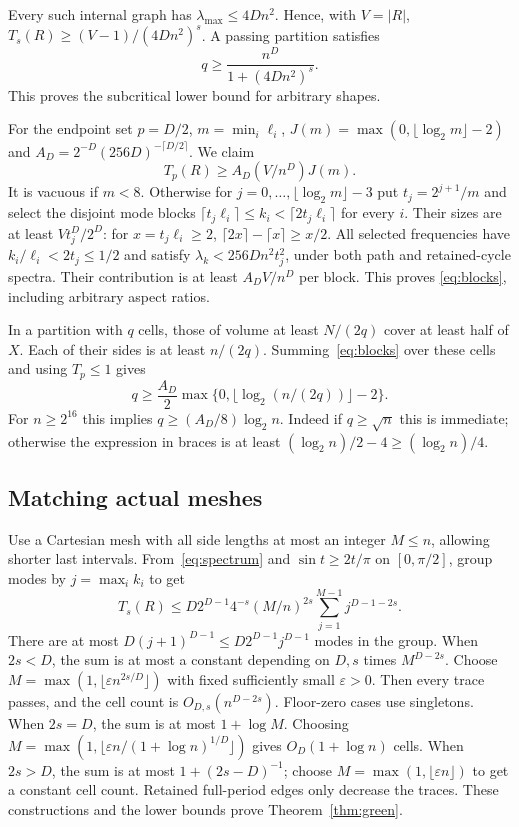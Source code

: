 \documentclass[11pt]{article}
\begin{document}
Every such internal graph has $\lambda_{\max}\le4Dn^2$. Hence, with
$V=|R|$, $T_s(R)\ge(V-1)/(4Dn^2)^s$. A passing partition satisfies
\begin{equation}\label{eq:subcrit}
 q\ge\frac{n^D}{1+(4Dn^2)^s}.
\end{equation}
This proves the subcritical lower bound for arbitrary shapes.

For the endpoint set $p=D/2$, $m=\min_i\ell_i$,
$J(m)=\max(0,\lfloor\log_2m\rfloor-2)$ and
$A_D=2^{-D}(256D)^{-\lceil D/2\rceil}$. We claim
\begin{equation}\label{eq:blocks}
 T_p(R)\ge A_D(V/n^D)J(m).
\end{equation}
It is vacuous if $m<8$. Otherwise for
$j=0,\ldots,\lfloor\log_2m\rfloor-3$ put $t_j=2^{j+1}/m$ and select
the disjoint mode blocks
$\lceil t_j\ell_i\rceil\le k_i<\lceil2t_j\ell_i\rceil$ for every $i$.
Their sizes are at least $Vt_j^D/2^D$: for $x=t_j\ell_i\ge2$,
$\lceil2x\rceil-\lceil x\rceil\ge x/2$.
All selected frequencies have $k_i/\ell_i<2t_j\le1/2$ and satisfy
$\lambda_k<256Dn^2t_j^2$, under both path and retained-cycle spectra.
Their contribution is at least $A_DV/n^D$ per block. This proves
\eqref{eq:blocks}, including arbitrary aspect ratios.

In a partition with $q$ cells, those of volume at least $N/(2q)$ cover
at least half of $X$. Each of their sides is at least $n/(2q)$.
Summing~\eqref{eq:blocks} over these cells and using $T_p\le1$ gives
\[
 q\ge\frac{A_D}{2}
 \max\{0,\lfloor\log_2(n/(2q))\rfloor-2\}.
\]
For $n\ge2^{16}$ this implies $q\ge(A_D/8)\log_2 n$.
Indeed if $q\ge\sqrt n$ this is immediate; otherwise the expression in
braces is at least $(\log_2 n)/2-4\ge(\log_2 n)/4$.

\subsection{Matching actual meshes}
Use a Cartesian mesh with all side lengths at most an integer $M\le n$,
allowing shorter last intervals. From~\eqref{eq:spectrum} and
$\sin t\ge2t/\pi$ on $[0,\pi/2]$, group modes by $j=\max_i k_i$ to get
\begin{equation}\label{eq:upper}
 T_s(R)\le D2^{D-1}4^{-s}(M/n)^{2s}
          \sum_{j=1}^{M-1}j^{D-1-2s}.
\end{equation}
There are at most $D(j+1)^{D-1}\le D2^{D-1}j^{D-1}$ modes in the group.
When $2s<D$, the sum is at most a constant depending on $D,s$ times
$M^{D-2s}$. Choose $M=\max(1,\lfloor\varepsilon n^{2s/D}\rfloor)$
with fixed sufficiently small $\varepsilon>0$. Then every trace passes,
and the cell count is $O_{D,s}(n^{D-2s})$. Floor-zero cases use singletons.
When $2s=D$, the sum is at most $1+\log M$. Choosing
$M=\max(1,\lfloor\varepsilon n/(1+\log n)^{1/D}\rfloor)$ gives
$O_D(1+\log n)$ cells. When $2s>D$, the sum is at most
$1+(2s-D)^{-1}$; choose $M=\max(1,\lfloor\varepsilon n\rfloor)$
to get a constant cell count. Retained full-period edges only decrease
the traces. These constructions and the lower bounds prove
Theorem~\ref{thm:green}.
\end{document}
